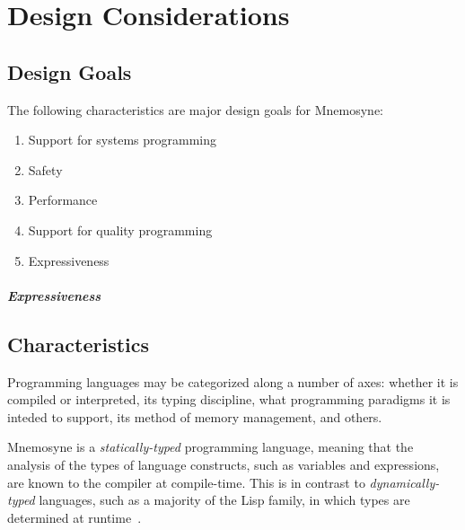 %
%
%
\chapter{Design Considerations} \label{ch:design}

\section{Design Goals} \label{sec:goals}

The following characteristics are major design goals for Mnemosyne:
\begin{enumerate}
    \item Support for systems programming
    \item Safety
    \item Performance
    \item Support for quality programming
    \item Expressiveness
\end{enumerate}

\paragraph{Expressiveness}
%

\section{Characteristics} \label{sec:characteristics}

Programming languages may be categorized along a number of axes: whether it is compiled or interpreted, its typing discipline, what programming paradigms it is inteded to support, its method of memory management, and others.

Mnemosyne is a \textit{statically-typed} programming language, meaning that the analysis of the types of language constructs, such as variables and expressions, are known to the compiler at compile-time. This is in contrast to \textit{dynamically-typed} languages, such as a majority of the Lisp family, in which types are determined at runtime~\cite{Mitchell:2003:TT:1074100.1074885}.

